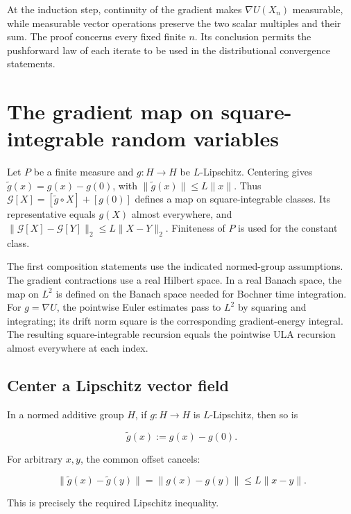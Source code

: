 \documentclass[11pt,a4paper]{report}
\begin{document}
At the induction step, continuity of the gradient makes \(\nabla U(X_n)\) measurable, while measurable vector operations preserve the two scalar multiples and their sum. The proof concerns every fixed finite \(n\). Its conclusion permits the pushforward law of each iterate to be used in the distributional convergence statements.

\section{\texorpdfstring{The gradient map on square-integrable random variables}{The gradient map on square-integrable random variables}}
\label{proof-module-UnadjustedLangevin-LpDrift-lean}


Let \(P\) be a finite measure and \(g:H\to H\) be \(L\)-Lipschitz. Centering gives \(\widetilde g(x)=g(x)-g(0)\), with \(\|\widetilde g(x)\|\le L\|x\|\). Thus \(\mathcal G[X]=[\widetilde g\circ X]+[g(0)]\) defines a map on square-integrable classes. Its representative equals \(g(X)\) almost everywhere, and \(\|\mathcal G[X]-\mathcal G[Y]\|_2\le L\|X-Y\|_2\). Finiteness of \(P\) is used for the constant class.



The first composition statements use the indicated normed-group assumptions. The gradient contractions use a real Hilbert space. In a real Banach space, the map on \(L^2\) is defined on the Banach space needed for Bochner time integration. For \(g=\nabla U\), the pointwise Euler estimates pass to \(L^2\) by squaring and integrating; its drift norm square is the corresponding gradient-energy integral. The resulting square-integrable recursion equals the pointwise ULA recursion almost everywhere at each index.

\subsection{\texorpdfstring{Center a Lipschitz vector field}{Center a Lipschitz vector field}}
\label{report-step-UnadjustedLangevin-LpDrift-lean-1}


In a normed additive group \(H\), if \(g:H\to H\) is \(L\)-Lipschitz, then so is

\[\widetilde g(x):=g(x)-g(0).\]

For arbitrary \(x,y\), the common offset cancels:

\[\|\widetilde g(x)-\widetilde g(y)\|=\|g(x)-g(y)\|\le L\|x-y\|.\]

This is precisely the required Lipschitz inequality.
\end{document}
